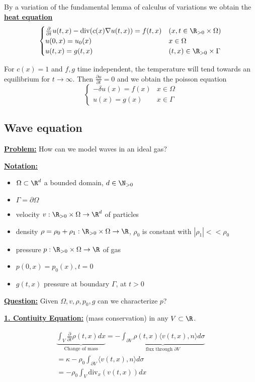 By a variation of the fundamental lemma of calculus of variations we obtain the \underline{\textbf{heat equation}}
 \[\begin{cases}\frac{\partial}{\partial t} u(t,x)-\text{div}(c(x)\nabla u(t,x))=f(t,x)& (x,t\in\R_{>0}\times \Omega)\\
    u(0,x)=u_0(x) & x\in \Omega\\
    u(t,x)=g(t,x) & (t,x) \in \R_{>0}\times \Gamma
\end{cases}
 \]

For $c(x)=1$ and $f,g$ time independent, the temperature will tend towards an equilibrium for $t\to\infty$. 
Then $\frac{\partial u}{\partial {t}}=0$ and we obtain the poisson equation
\[\begin{cases}
    -\delta u(x)=f(x) & x\in \Omega \\
    u(x)=g(x)&x\in\Gamma
\end{cases}\]


\subsection{Wave equation}

\underline{\textbf{Problem:}} How can we model waves in an ideal gas?

\underline{\textbf{Notation:}}
\begin{itemize}
    \item $\Omega\subset \R^d$ a bounded domain, $d\in \N_{>0}$
    \item $\Gamma=\partial \Omega$
    \item velocity $v:\R_{>0}\times \Omega\to \R^d$ of particles
    \item density $\rho=\rho_0+\rho_1:\R_{>0}\times \Omega \to \R$, $\rho_0$ is constant with $|\rho_1|<<\rho_0$
    \item pressure $p:\R_{>0}\times \Omega\to \R$ of gas
    \item $p(0,x)=p_0(x), t=0$
    \item $g(t,x)$ pressure at boundary $\Gamma$, at $t>0$
\end{itemize}

\underline{\textbf{Question:}} Given $\Omega,v,\rho,p_0,g$ can we characterize $p$?

\underline{\textbf{1. Contiuity Equation:}} (mass conservation) in any $V\subset \R$.

\begin{align*}
    \underbrace{\int_V\frac{\partial}{\partial t}\rho(t,x)dx}_{\text{Change of mass}}= - \underbrace{\int_{\partial V} \rho(t,x) \langle v(t,x),n \rangle d\sigma}_{\text{flux through }\partial V}\\
    =\kappa - \rho_0 \int_{\partial V} \langle v(t,x),n \rangle d\sigma \\ 
    =-\rho_0 \int_V \text{div}_x(v(t,x))dx
\end{align*}

